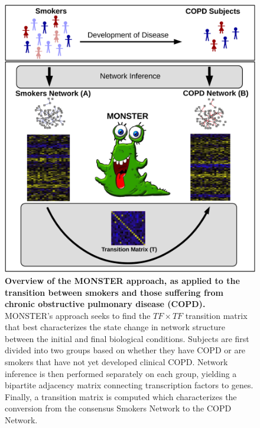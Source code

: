 \begin{figure}
\includegraphics[width=1\columnwidth]{figures/figure1c}
\caption[Overview of the MONSTER approach]{\textbf{Overview of the MONSTER approach, as applied to the transition between smokers and those suffering from chronic obstructive pulmonary disease (COPD).} MONSTER's approach seeks to find the $TF\times TF$ transition matrix that best characterizes the state change in network structure between the initial and final biological conditions. Subjects are first divided into two groups based on whether they have COPD or are smokers that have not yet developed clinical COPD. Network inference is then performed separately on each group, yielding a bipartite adjacency matrix connecting transcription factors to genes. Finally, a transition matrix is computed which characterizes the conversion from the consensus Smokers Network to the COPD Network.}
\label{fig:overview}
\end{figure}

